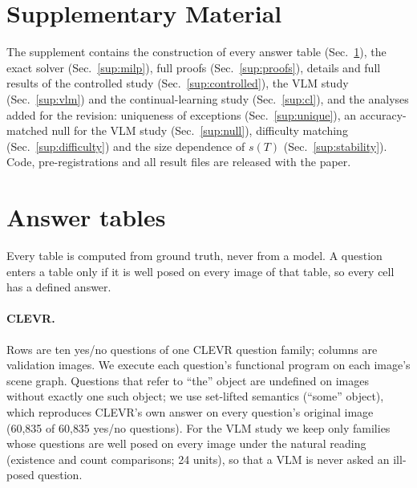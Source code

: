 
\appendix
\renewcommand{\thesection}{S\arabic{section}}
\renewcommand{\thetable}{S\arabic{table}}
\renewcommand{\thefigure}{S\arabic{figure}}
\setcounter{table}{0}\setcounter{figure}{0}

\section*{Supplementary Material}

\noindent
The supplement contains the construction of every answer table (Sec.~\ref{sup:tables}),
the exact solver (Sec.~\ref{sup:milp}), full proofs (Sec.~\ref{sup:proofs}), details and
full results of the controlled study (Sec.~\ref{sup:controlled}), the VLM study
(Sec.~\ref{sup:vlm}) and the continual-learning study (Sec.~\ref{sup:cl}), and the analyses added for the revision:
uniqueness of exceptions (Sec.~\ref{sup:unique}), an accuracy-matched null for the VLM study (Sec.~\ref{sup:null}),
difficulty matching (Sec.~\ref{sup:difficulty}) and the size dependence of $s(T)$ (Sec.~\ref{sup:stability}). Code, pre-registrations and all result files are released with the paper.

\section{Answer tables}
\label{sup:tables}

Every table is computed from ground truth, never from a model. A question enters a table only
if it is well posed on every image of that table, so every cell has a defined answer.

\paragraph{CLEVR.}
Rows are ten yes/no questions of one CLEVR question family; columns are validation images. We
execute each question's functional program on each image's scene graph. Questions that refer
to ``the'' object are undefined on images without exactly one such object; we use set-lifted
semantics (``some'' object), which reproduces CLEVR's own answer on every question's original
image (60{,}835 of 60{,}835 yes/no questions). For the VLM study we keep only families whose
questions are well posed on every image under the natural reading (existence and count
comparisons; 24 units), so that a VLM is never asked an ill-posed question.

